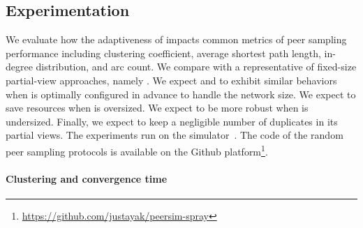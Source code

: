 \subsection{Experimentation}
\label{subsec:experiments}

We evaluate how the adaptiveness of \SPRAY impacts common metrics of
peer sampling performance including clustering coefficient, average
shortest path length, in-degree distribution, and arc count. We
compare \SPRAY with a representative of fixed-size partial-view
approaches, namely \CYCLON. We expect \SPRAY and \CYCLON to exhibit 
similar behaviors when \CYCLON is optimally configured in advance to
handle the network size. We expect \SPRAY to save resources when
\CYCLON is oversized. We expect \SPRAY to be more robust when \CYCLON
is undersized. Finally, we expect \SPRAY to keep a negligible number
of duplicates in its partial views. The experiments run on the
\PEERSIM simulator~\cite{montresor2009peersim}. The code of the random
peer sampling protocols is available on the Github
platform\footnote{\url{https://github.com/justayak/peersim-spray}}.









\vspace{-7pt}
\paragraph{Clustering and convergence time}

